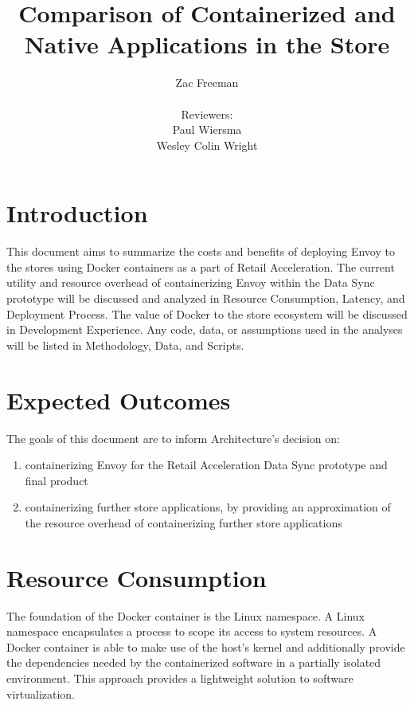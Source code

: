 \documentclass{article}
\begin{document}
\title{Comparison of Containerized and Native Applications in the Store}
\author{Zac Freeman\\\\Reviewers:\\Paul Wiersma\\ Wesley Colin Wright}

\maketitle

\section{Introduction}
This document aims to summarize the costs and benefits of deploying Envoy to the stores using Docker containers as a part of Retail Acceleration. The current utility and resource overhead of containerizing Envoy within the Data Sync prototype will be discussed and analyzed in Resource Consumption, Latency, and Deployment Process. The value of Docker to the store ecosystem will be discussed in Development Experience. Any code, data, or assumptions used in the analyses will be listed in Methodology, Data, and Scripts.

\section{Expected Outcomes}
The goals of this document are to inform Architecture's decision on:
\begin{enumerate}
    \item containerizing Envoy for the Retail Acceleration Data Sync prototype and final product
    \item containerizing further store applications, by providing an approximation of the resource overhead of containerizing further store applications
\end{enumerate}

\section{Resource Consumption}
The foundation of the Docker container is the Linux namespace. A Linux namespace encapsulates a process to scope its access to system resources. A Docker container is able to make use of the host's kernel and additionally provide the dependencies needed by the containerized software in a partially isolated environment. This approach provides a lightweight solution to software virtualization.
\end{document}
